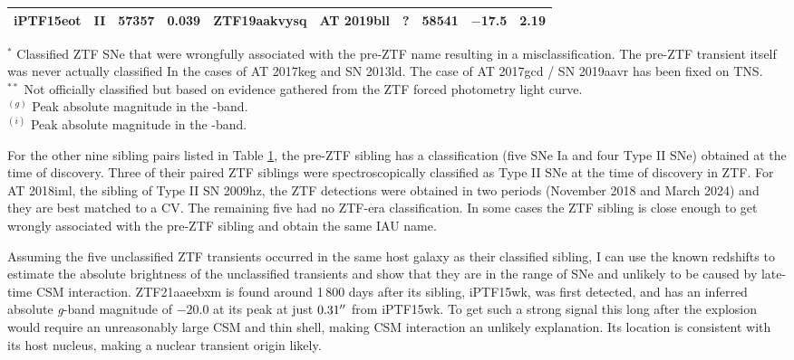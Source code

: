 \documentclass[a4paper,oneside,12pt, class=Latex/Classes/PhDthesisPSnPDF, crop=false]{standalone}
\begin{document}
\begin{table}
{\begin{tabular}{cccc|cccccc}
        iPTF15eot & II & 57357 & 0.039 & ZTF19aakvysq & AT 2019bll & ? & 58541 & $-$17.5 & 2.19 \\
        \hline
    \end{tabular}
    }
    \begin{flushleft}
        $^*$ Classified ZTF SNe that were wrongfully associated with the pre-ZTF name resulting in a misclassification. The pre-ZTF transient itself was never actually classified In the cases of AT 2017keg and SN 2013ld. The case of AT 2017gcd / SN 2019aavr has been fixed on TNS.\\
        $^{**}$ Not officially classified but based on evidence gathered from the ZTF forced photometry light curve.\\
        $^{(g)}$ Peak absolute magnitude in the \ztfg-band.\\
        $^{(i)}$ Peak absolute magnitude in the \ztfi-band.\\
    \end{flushleft}
    \label{sibling_table}
\end{table}

For the other nine sibling pairs listed in Table \ref{sibling_table}, the pre-ZTF sibling has a classification (five SNe Ia and four Type II SNe) obtained at the time of discovery. Three of their paired ZTF siblings were spectroscopically classified as Type II SNe at the time of discovery in ZTF. For AT 2018iml, the sibling of Type II SN 2009hz, the ZTF detections were obtained in two periods (November 2018 and March 2024) and they are best matched to a CV. The remaining five had no ZTF-era classification. In some cases the ZTF sibling is close enough to get wrongly associated with the pre-ZTF sibling and obtain the same IAU name.

Assuming the five unclassified ZTF transients occurred in the same host galaxy as their classified sibling, I can use the known redshifts to estimate the absolute brightness of the unclassified transients and show that they are in the range of SNe and unlikely to be caused by late-time CSM interaction.
ZTF21aaeebxm is found around 1\,800 days after its sibling, iPTF15wk, was first detected, and has an inferred absolute \textit{g}-band magnitude of $-20.0$ at its peak at just $0.31^{\prime\prime}$ from iPTF15wk. To get such a strong signal this long after the explosion would require an unreasonably large CSM and thin shell, making CSM interaction an unlikely explanation. Its location is consistent with its host nucleus, making a nuclear transient origin likely.
\end{document}
